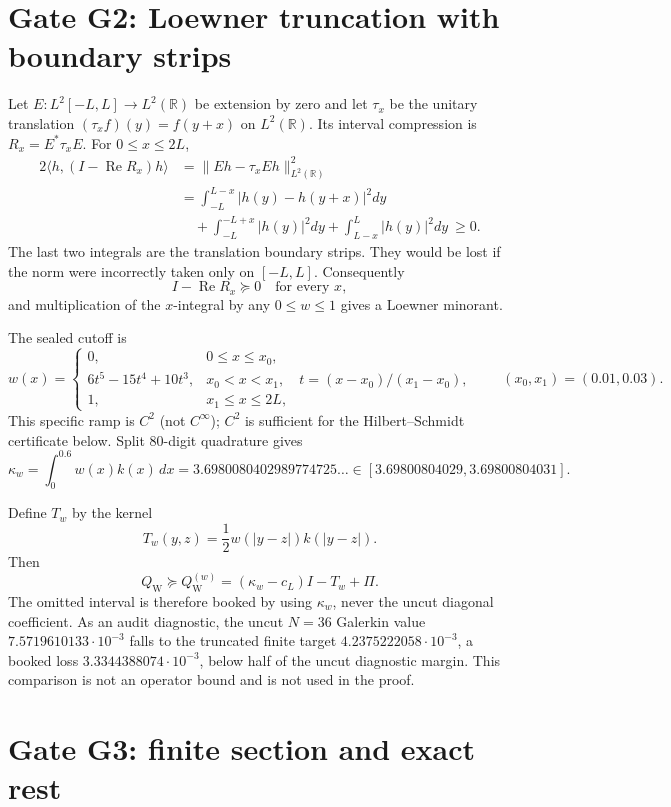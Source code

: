 \documentclass[11pt]{article}
\newcommand{\QW}{Q_{\mathrm W}}
\begin{document}
\section{Gate G2: Loewner truncation with boundary strips}

Let $E:L^2[-L,L]\to L^2(\mathbb R)$ be extension by zero and let
$\tau_x$ be the unitary translation
$(\tau_xf)(y)=f(y+x)$ on $L^2(\mathbb R)$.  Its interval compression
is $R_x=E^*\tau_xE$.  For $0\le x\le2L$,
\begin{align*}
 2\langle h,(I-\operatorname{Re}R_x)h\rangle
 &=\|Eh-\tau_xEh\|_{L^2(\mathbb R)}^2\\
 &=\int_{-L}^{L-x}|h(y)-h(y+x)|^2dy\\
 &\quad+\int_{-L}^{-L+x}|h(y)|^2dy
       +\int_{L-x}^{L}|h(y)|^2dy\ \ge0 .
\end{align*}
The last two integrals are the translation boundary strips.  They
would be lost if the norm were incorrectly taken only on
$[-L,L]$.  Consequently
\[
 I-\operatorname{Re}R_x\succeq0
 \quad\text{for every }x,
\]
and multiplication of the $x$-integral by any $0\le w\le1$ gives a
Loewner minorant.

The sealed cutoff is
\[
 w(x)=
 \begin{cases}
 0,&0\le x\le x_0,\\
 6t^5-15t^4+10t^3,&x_0<x<x_1,\quad
 t=(x-x_0)/(x_1-x_0),\\
 1,&x_1\le x\le2L,
 \end{cases}
 \qquad (x_0,x_1)=(0.01,0.03).
\]
This specific ramp is $C^2$ (not $C^\infty$); $C^2$ is sufficient
for the Hilbert--Schmidt certificate below.  Split 80-digit
quadrature gives
\[
 \kappa_w=\int_0^{0.6}w(x)k(x)\,dx
 =3.6980080402989774725\ldots
 \in[3.69800804029,3.69800804031].
\]

Define $T_w$ by the kernel
\[
 T_w(y,z)=\frac12w(|y-z|)k(|y-z|).
\]
Then
\[
 \QW\succeq \QW^{(w)}
  =(\kappa_w-c_L)I-T_w+\Pi.
\]
The omitted interval is therefore booked by using
\emph{$\kappa_w$}, never the uncut diagonal coefficient.  As an
audit diagnostic, the uncut $N=36$ Galerkin value
$7.5719610133\cdot10^{-3}$ falls to the truncated finite target
$4.2375222058\cdot10^{-3}$, a booked loss
$3.3344388074\cdot10^{-3}$, below half of the uncut diagnostic
margin.  This comparison is not an operator bound and is not used
in the proof.

\section{Gate G3: finite section and exact rest}
\end{document}
